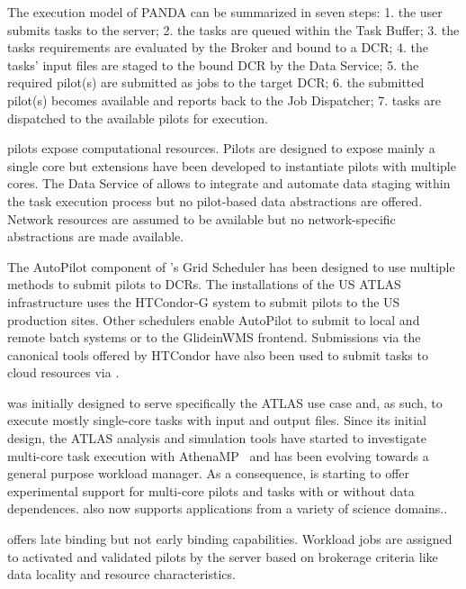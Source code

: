 \documentclass{sig-alternate}
\begin{document}
The execution model of PANDA can be summarized in seven steps: 1. the user
submits tasks to the \panda server; 2. the tasks are queued within the Task
Buffer; 3. the tasks requirements are evaluated by the Broker and bound to a
DCR; 4. the tasks' input files are staged to the bound DCR by the Data Service;
5. the required pilot(s) are submitted as jobs to the target DCR; 6. the
submitted pilot(s) becomes available and reports back to the Job Dispatcher;
7. tasks are dispatched to the available pilots for execution.


\panda pilots expose computational resources. Pilots are designed to expose
mainly a single core but extensions have been developed to instantiate pilots
with multiple cores. The Data Service of \panda allows to integrate and automate
data staging within the task execution process but no pilot-based data
abstractions are offered. Network resources are assumed to be available but no
network-specific abstractions are made available.

The AutoPilot component of \panda's Grid Scheduler has been designed to use
multiple methods to submit pilots to DCRs. The \panda installations of the US
ATLAS infrastructure uses the HTCondor-G system to submit pilots to the US
production sites. Other schedulers enable AutoPilot to submit to local and
remote batch systems or to the GlideinWMS frontend. Submissions via the
canonical tools offered by HTCondor have also been used to submit tasks to cloud
resources via
\panda.

\panda was initially designed to serve specifically the ATLAS use case and, as
such, to execute mostly single-core tasks with input and output files. Since its
initial design, the ATLAS analysis and simulation tools have started to
investigate multi-core task execution with AthenaMP~\cite{crooks2012} and \panda
has been evolving towards a general purpose workload manager. As a consequence,
\panda is starting to offer experimental support for multi-core pilots and tasks
with or without data dependences. \panda also now supports applications from a
variety of science domains.\cite{x,y}.

\panda offers late binding but not early binding capabilities. Workload jobs are
assigned to activated and validated pilots by the \panda server based on
brokerage criteria like data locality and resource characteristics.
\end{document}
